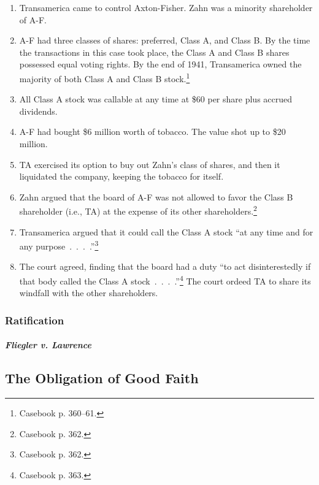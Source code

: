 \begin{enumerate}
    \item Transamerica came to control Axton-Fisher. Zahn was a minority 
    shareholder of A-F.
    \item A-F had three classes of shares: preferred, Class A, and Class B. 
    By the time the transactions in this case took place, the Class A and 
    Class B shares possessed equal voting rights. By the end of 1941, 
    Transamerica owned the majority of both Class A and Class B 
    stock.\footnote{Casebook p. 360--61.}
    \item All Class A stock was callable at any time at \$60 per share plus 
    accrued dividends.
    \item A-F had bought \$6 million worth of tobacco. The value shot up to 
    \$20 million.
    \item TA exercised its option to buy out Zahn's class of shares, 
    and then it liquidated the company, keeping the tobacco for itself.
    \item Zahn argued that the board of A-F was not allowed to favor the Class 
    B shareholder (i.e., TA) at the expense of its other 
    shareholders.\footnote{Casebook p. 362.}
    \item Transamerica argued that it could call the Class A stock ``at any 
    time and for any purpose~.~.~.~.''\footnote{Casebook p. 362.}
    \item The court agreed, finding that the board had a duty ``to act 
    disinterestedly if that body called the Class A 
    stock~.~.~.~.''\footnote{Casebook p. 363.} The court ordeed TA to share 
    its windfall with the other shareholders.
\end{enumerate}

\newpage %

\subsubsection{Ratification}

\paragraph{\emph{Fliegler v. Lawrence}}



\subsection{The Obligation of Good Faith}

